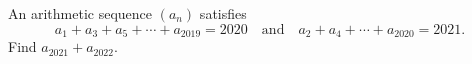 An arithmetic sequence $(a_n)$ satisfies
\[a_1+a_3+a_5+\cdots+a_{2019}=2020\quad\text{and}\quad a_2+a_4+\cdots+a_{2020}=2021.\]
Find $a_{2021}+a_{2022}$.
